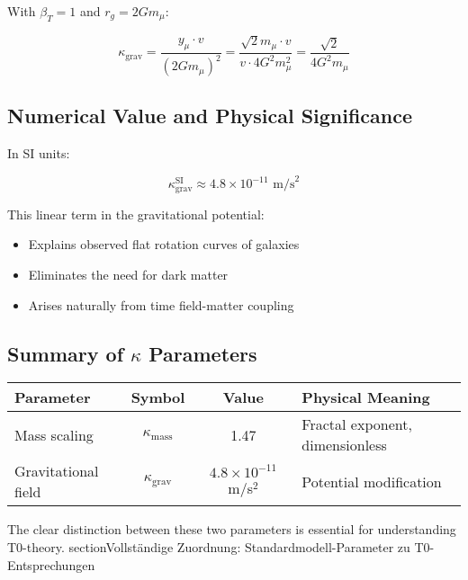 \documentclass[12pt,a4paper]{article}
\begin{document}
	With $\beta_T = 1$ and $r_g = 2Gm_\mu$:
	
	\begin{equation}
		\kappa_{\text{grav}} = \frac{y_\mu \cdot v}{(2Gm_\mu)^2} = \frac{\sqrt{2} m_\mu \cdot v}{v \cdot 4G^2m_\mu^2} = \frac{\sqrt{2}}{4G^2m_\mu}
	\end{equation}
	
	\subsection{Numerical Value and Physical Significance}
	
	In SI units:
	
	\begin{equation}
		\kappa_{\text{grav}}^{\text{SI}} \approx 4.8 \times 10^{-11} \text{ m/s}^2
	\end{equation}
	
	This linear term in the gravitational potential:
	\begin{itemize}
		\item Explains observed flat rotation curves of galaxies
		\item Eliminates the need for dark matter
		\item Arises naturally from time field-matter coupling
	\end{itemize}
	
	\subsection{Summary of $\kappa$ Parameters}
	
	\begin{center}
		\begin{tabular}{|l|c|c|l|}
			\hline
			\textbf{Parameter} & \textbf{Symbol} & \textbf{Value} & \textbf{Physical Meaning} \\
			\hline
			Mass scaling & $\kappa_{\text{mass}}$ & 1.47 & Fractal exponent, dimensionless \\
			Gravitational field & $\kappa_{\text{grav}}$ & $4.8 \times 10^{-11}$ m/s$^2$ & Potential modification \\
			\hline
		\end{tabular}
	\end{center}
	
	The clear distinction between these two parameters is essential for understanding T0-theory.
section{Vollständige Zuordnung: Standardmodell-Parameter zu T0-Entsprechungen}
\label{sec:sm_t0_mapping}
\end{document}
